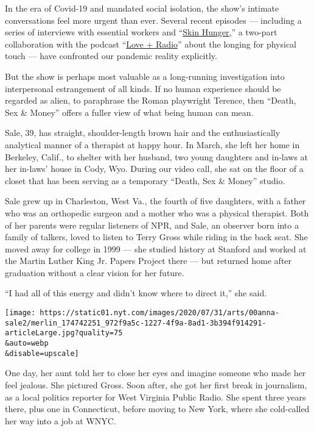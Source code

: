In the era of Covid-19 and mandated social isolation, the show's
intimate conversations feel more urgent than ever. Several recent
episodes --- including a series of interviews with essential workers and
``\href{https://www.wnycstudios.org/podcasts/deathsexmoney/episodes/skin-hunger-love-radio-part-1}{Skin
Hunger,}'' a two-part collaboration with the podcast
``\href{https://loveandradio.org/}{Love + Radio}'' about the longing for
physical touch --- have confronted our pandemic reality explicitly.

But the show is perhaps most valuable as a long-running investigation
into interpersonal estrangement of all kinds. If no human experience
should be regarded as alien, to paraphrase the Roman playwright Terence,
then ``Death, Sex \& Money'' offers a fuller view of what being human
can mean.

Sale, 39, has straight, shoulder-length brown hair and the
enthusiastically analytical manner of a therapist at happy hour. In
March, she left her home in Berkeley, Calif., to shelter with her
husband, two young daughters and in-laws at her in-laws' house in Cody,
Wyo. During our video call, she sat on the floor of a closet that has
been serving as a temporary ``Death, Sex \& Money'' studio.

Sale grew up in Charleston, West Va., the fourth of five daughters, with
a father who was an orthopedic surgeon and a mother who was a physical
therapist. Both of her parents were regular listeners of NPR, and Sale,
an observer born into a family of talkers, loved to listen to Terry
Gross while riding in the back seat. She moved away for college in 1999
--- she studied history at Stanford and worked at the Martin Luther King
Jr. Papers Project there --- but returned home after graduation without
a clear vision for her future.

``I had all of this energy and didn't know where to direct it,'' she
said.

\texttt{[image: https://static01.nyt.com/images/2020/07/31/arts/00anna-sale2/merlin\_174742251\_972f9a5c-1227-4f9a-8ad1-3b394f914291-articleLarge.jpg?quality=75\\\&auto=webp\\\&disable=upscale]}

One day, her aunt told her to close her eyes and imagine someone who
made her feel jealous. She pictured Gross. Soon after, she got her first
break in journalism, as a local politics reporter for West Virginia
Public Radio. She spent three years there, plus one in Connecticut,
before moving to New York, where she cold-called her way into a job at
WNYC.

